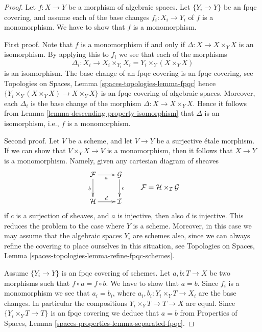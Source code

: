 \begin{proof}
Let $f : X \to Y$ be a morphism of algebraic spaces.
Let $\{Y_i \to Y\}$ be an fpqc covering, and assume
each of the base changes $f_i : X_i \to Y_i$ of $f$ is
a monomorphism. We have to show that $f$ is a monomorphism.

\medskip\noindent
First proof. Note that $f$ is a monomorphism if and only if
$\Delta : X \to X \times_Y X$ is an isomorphism. By applying this to
$f_i$ we see that each of the morphisms
$$
\Delta_i :
X_i
\longrightarrow
X_i \times_{Y_i} X_i = Y_i \times_Y (X \times_Y X)
$$
is an isomorphism. The base change of an fpqc covering is an fpqc covering, see
Topologies on Spaces, Lemma \ref{spaces-topologies-lemma-fpqc}
hence $\{Y_i \times_Y (X \times_Y X) \to X \times_Y X\}$
is an fpqc covering of algebraic spaces. Moreover, each
$\Delta_i$ is the base change of the morphism
$\Delta : X \to X \times_Y X$. Hence it follows from
Lemma \ref{lemma-descending-property-isomorphism}
that $\Delta$ is an isomorphism, i.e., $f$ is a monomorphism.

\medskip\noindent
Second proof.
Let $V$ be a scheme, and let $V \to Y$ be a surjective \'etale morphism.
If we can show that $V \times_Y X \to V$ is a monomorphism, then it
follows that $X \to Y$ is a monomorphism. Namely, given any
cartesian diagram of sheaves
$$
\vcenter{
\xymatrix{
\mathcal{F} \ar[r]_a \ar[d]_b & \mathcal{G} \ar[d]^c \\
\mathcal{H} \ar[r]^d & \mathcal{I}
}
}
\quad
\quad
\mathcal{F} = \mathcal{H} \times_\mathcal{I} \mathcal{G}
$$
if $c$ is a surjection of sheaves, and $a$ is injective, then also
$d$ is injective. This reduces the problem to the case where $Y$ is
a scheme. Moreover, in this case we may assume that the algebraic spaces
$Y_i$ are schemes also, since we can always refine the covering to place
ourselves in this situation, see
Topologies on Spaces, Lemma \ref{spaces-topologies-lemma-refine-fpqc-schemes}.

\medskip\noindent
Assume $\{Y_i \to Y\}$ is an fpqc covering of schemes.
Let $a, b : T \to X$ be two morphisms
such that $f \circ a = f \circ b$. We have to show that $a = b$.
Since $f_i$ is a monomorphism we see that $a_i = b_i$, where
$a_i, b_i : Y_i \times_Y T \to X_i$ are
the base changes. In particular the compositions
$Y_i \times_Y T \to T \to X$ are equal.
Since $\{Y_i \times_Y T \to T\}$ is an fpqc covering we
deduce that $a = b$ from
Properties of Spaces, Lemma \ref{spaces-properties-lemma-separated-fpqc}.
\end{proof}




